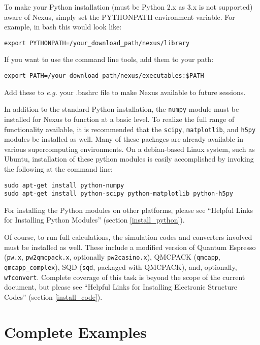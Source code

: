 \documentclass[oneside,11pt]{memoir}
\numberwithin{equation}{section}
\begin{document}
To make your Python installation (must be Python 2.x as 3.x is not supported) 
aware of Nexus, simply set the 
PYTHONPATH environment variable.  For example, in bash this would look like:
\begin{shaded}
\begin{verbatim}
export PYTHONPATH=/your_download_path/nexus/library
\end{verbatim}
\end{shaded}
If you want to use the command line tools, add them to your path:
\begin{shaded}
\begin{verbatim}
export PATH=/your_download_path/nexus/executables:$PATH
\end{verbatim}
\end{shaded}
Add these to \emph{e.g.} your .bashrc file to make Nexus available 
to future sessions.

In addition to the standard Python installation, the \texttt{numpy} module must 
be installed for Nexus to function at a basic level.  To realize 
the full range of functionality available, it is recommended that the 
\texttt{scipy}, \texttt{matplotlib}, and \texttt{h5py} modules be installed as 
well.  Many of these packages are already available in various supercomputing 
environments.  On a debian-based Linux system, such as Ubuntu, installation of 
these python modules is easily accomplished by invoking the following at the 
command line:
\begin{shaded}
\begin{verbatim}
sudo apt-get install python-numpy
sudo apt-get install python-scipy python-matplotlib python-h5py 
\end{verbatim}
\end{shaded}
For installing the Python modules on other platforms, please see 
``Helpful Links for Installing Python Modules'' (section \ref{install_python}).

Of course, to run full calculations, the simulation codes and converters 
involved must be installed as well.  These include a modified version of 
Quantum Espresso (\texttt{pw.x}, \texttt{pw2qmcpack.x}, optionally 
\texttt{pw2casino.x}), QMCPACK (\texttt{qmcapp}, \texttt{qmcapp\_complex}), 
SQD (\texttt{sqd}, packaged with QMCPACK), and, optionally, \texttt{wfconvert}.  
Complete coverage of this task is beyond the scope of the current document, but 
please see ``Helpful Links for Installing Electronic Structure Codes'' 
(section \ref{install_code}).


\pagebreak
\chapter{Complete Examples} \label{examples}
\end{document}

